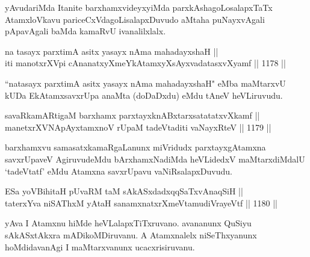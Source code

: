 \begin{artha}
yAvudariMda Itanite barxhamxvideyxyiMda parxkAshagoLosalapxTaTx AtamxloVkavu pariceCxVdagoLisalapxDuvudo aMtaha puNayxvAgali pApavAgali baMda kamaRvU ivanalilxlalx.
\end{artha}


\begin{shl}
na tasayx parxtimA asitx yasayx nAma mahadayxshaH || \\
iti manotxrXV\s pi cA\s \s nanatxyXmeYkAtamxyXsAyxvadatasxvXyamf ||  1178 ||  
\end{shl}

\begin{artha}
``natasayx parxtimA asitx yasayx nAma mahadayxshaH" eMba maMtarxvU kUDa EkAtamxsavxrUpa anaMta (doDaDxdu) eMdu tAneV heVLiruvudu.
\end{artha}

\begin{shl}
savaRkamARtigaM barxhamx parxtayxknABxtarxsatatatxvXkamf || \\
manetxrXVNApAyxtamxnoV rUpaM tadeVtaditi vaNayxRteV ||  1179 ||  
\end{shl}

\begin{artha}
barxhamxvu samasatxkamaRgaLanunx miVridudx parxtayxgAtamxna savxrUpaveV AgiruvudeMdu bArxhamxNadiMda heVLidedxV maMtarxdiMdalU `tadeVtatf' eMdu Atamxna savxrUpavu vaNiRsalapxDuvudu.
\end{artha}



\begin{shl}
ESa yoV\s BihitaH pUvaRM taM sAkASxdadxqqSaTxvAnaqSiH || \\
taterxYva niSAThxM yAtaH sanamxnatxrXmeVtamudiVrayeVtf ||  1180 ||  
\end{shl}

\begin{artha}
yAva I Atamxnu hiMde heVLalapxTiTxruvano. avananunx QuSiyu sAkASxtAkxra mADikoMDiruvanu. A Atamxnalelx niSeThxyanunx hoMdidavanAgi I maMtarxvanunx ucacxrisiruvanu.
\end{artha}

